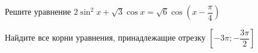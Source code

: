 \begin{ex}
	\begin{condition}
		\begin{enumcols}[label=\asbuk*)]
			\item Решите уравнение \( 2\sin^2 x + \sqrt{3}\cos x = \sqrt{6}\cos{\left(x-  \dfrac{\pi}{4}\right)} \)
			\item Найдите все корни уравнения, принадлежащие отрезку \( \left[-3\pi;-\dfrac{3\pi}{2}\right]  \)
		\end{enumcols}
	\end{condition}
\end{ex}
